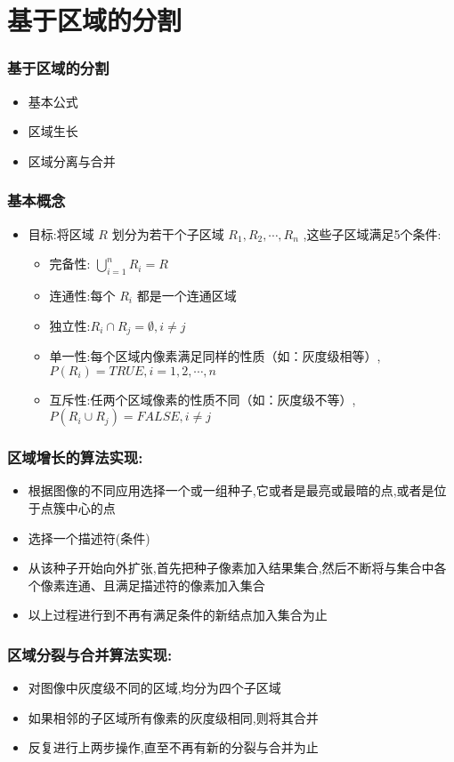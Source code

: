 \documentclass{beamer}
\begin{document}
\section{基于区域的分割}
\label{sec-5}
\begin{frame}
\frametitle{基于区域的分割}
\label{sec-5-1}

\begin{itemize}
\item 基本公式
\item 区域生长
\item 区域分离与合并
\end{itemize}
\end{frame}
\begin{frame}
\frametitle{基本概念}
\label{sec-5-2}

\begin{itemize}
\item 目标:将区域 $R$ 划分为若干个子区域 $R_1,R_2,\cdots,R_n$ ,这些子区域满足5个条件:
\begin{itemize}
\item 完备性:  $\bigcup_{i=1}^n R_i=R$
\item 连通性:每个 $R_i$ 都是一个连通区域
\item 独立性:$R_i\cap R_j=\emptyset,i\neq j$
\item 单一性:每个区域内像素满足同样的性质（如：灰度级相等）, $P(R_i)= TRUE,i = 1,2,\cdots,n$
\item 互斥性:任两个区域像素的性质不同（如：灰度级不等）, $P(R_i\cup R_j)= FALSE,i\neq j$
\end{itemize}
\end{itemize}
\end{frame}
\begin{frame}
\frametitle{区域增长的算法实现:}
\label{sec-5-3}

\begin{itemize}
\item 根据图像的不同应用选择一个或一组种子,它或者是最亮或最暗的点,或者是位于点簇中心的点
\item 选择一个描述符(条件)
\item 从该种子开始向外扩张,首先把种子像素加入结果集合,然后不断将与集合中各个像素连通、且满足描述符的像素加入集合
\item 以上过程进行到不再有满足条件的新结点加入集合为止
\end{itemize}
\end{frame}
\begin{frame}
\frametitle{区域分裂与合并算法实现:}
\label{sec-5-4}

\begin{itemize}
\item 对图像中灰度级不同的区域,均分为四个子区域
\item 如果相邻的子区域所有像素的灰度级相同,则将其合并
\item 反复进行上两步操作,直至不再有新的分裂与合并为止
\end{itemize}
\end{frame}
\end{document}
